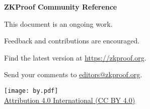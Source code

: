 \begin{center}
\vspace*{5em}
{\bfseries\Huge ZKProof Community Reference}

\vspace{1em} 


\vspace{2em}
\todayext


\vfill
This document is an ongoing work.

Feedback and contributions are encouraged.

Find the latest version at \url{https://zkproof.org}.

Send your comments to \href{mailto:editors@zkproof.org}{editors@zkproof.org}.


\vfill
\texttt{[image: by.pdf]}\\
\href{https://creativecommons.org/licenses/by/4.0/}{Attribution 4.0 International (CC BY 4.0)}

\end{center}

